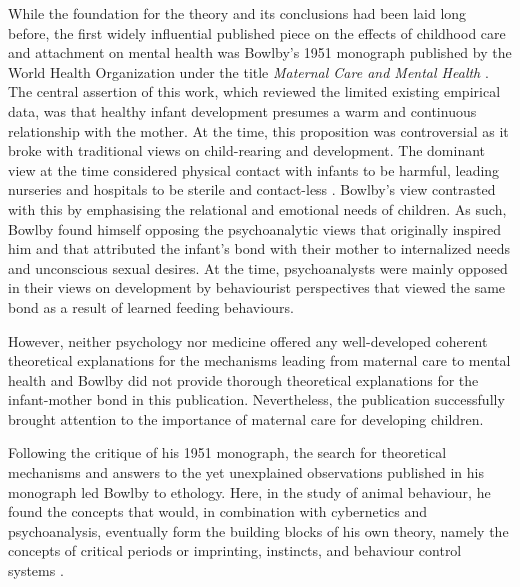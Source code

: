 \documentclass[12pt]{report}
\begin{document}
While the foundation for the theory and its conclusions had been laid long before, the first widely influential published piece on the effects of childhood care and attachment on mental health was Bowlby's 1951 monograph published by the World Health Organization under the title \textit{Maternal Care and Mental Health} \cite{bowlby1951WHO}.
The central assertion of this work, which reviewed the limited existing empirical data, was that healthy infant development presumes a warm and continuous relationship with the mother.
At the time, this proposition was controversial as it broke with traditional views on child-rearing and development. The dominant view at the time considered physical contact with infants to be harmful, leading nurseries and hospitals to be sterile and contact-less \cite{Karen1994}.
Bowlby's view contrasted with this by emphasising the relational and emotional needs of children. As such, Bowlby found himself opposing the psychoanalytic views that originally inspired him and that attributed the infant's bond with their mother to internalized needs and unconscious sexual desires.
At the time, psychoanalysts were mainly opposed in their views on development by behaviourist perspectives that viewed the same bond as a result of learned feeding behaviours.

However, neither psychology nor medicine offered any well-developed coherent theoretical explanations for the mechanisms leading from maternal care to mental health \cite{Bowlby1988, who1962deprivation} and Bowlby did not provide thorough theoretical explanations for the infant-mother bond in this publication.
Nevertheless, the publication successfully brought attention to the importance of maternal care for developing children.

Following the critique of his 1951 monograph, the search for theoretical mechanisms and answers to the yet unexplained observations published in his monograph led Bowlby to ethology.
Here, in the study of animal behaviour, he found the concepts that would, in combination with cybernetics and psychoanalysis, eventually form the building blocks of his own theory, namely the concepts of critical periods or imprinting, instincts, and behaviour control systems \cite{Bowlby1988,bowlby1953critical}.
\end{document}
